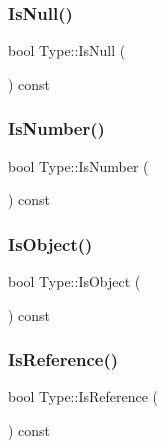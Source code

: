 \mbox{\label{class_type_a8d7b724a3acd08a8f7f2bb9af48280e3}} 
\subsubsection{\texorpdfstring{Is\+Null()}{IsNull()}}
{\footnotesize\ttfamily bool Type\+::\+Is\+Null (\begin{DoxyParamCaption}{ }\end{DoxyParamCaption}) const}

\mbox{\label{class_type_a66a75ac94e749abc366ea9a6a4a1c35f}} 
\subsubsection{\texorpdfstring{Is\+Number()}{IsNumber()}}
{\footnotesize\ttfamily bool Type\+::\+Is\+Number (\begin{DoxyParamCaption}{ }\end{DoxyParamCaption}) const}

\mbox{\label{class_type_abbc365cac181652bdeb3c04bdaffea29}} 
\subsubsection{\texorpdfstring{Is\+Object()}{IsObject()}}
{\footnotesize\ttfamily bool Type\+::\+Is\+Object (\begin{DoxyParamCaption}{ }\end{DoxyParamCaption}) const}

\mbox{\label{class_type_af8cf2c61d621a1fe279c7be850158906}} 
\subsubsection{\texorpdfstring{Is\+Reference()}{IsReference()}}
{\footnotesize\ttfamily bool Type\+::\+Is\+Reference (\begin{DoxyParamCaption}{ }\end{DoxyParamCaption}) const}

